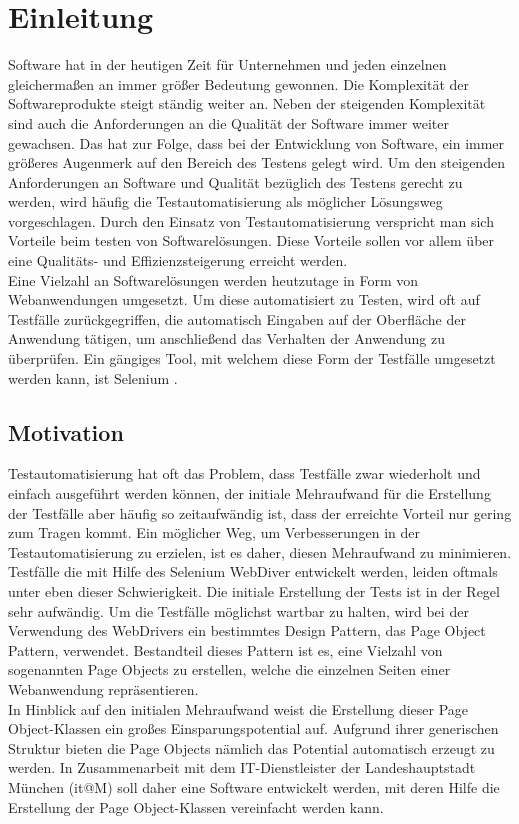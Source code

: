 \chapter{Einleitung}
\label{sec:einleitung}
Software hat in der heutigen Zeit für Unternehmen und jeden einzelnen gleichermaßen an immer größer Bedeutung gewonnen.
Die Komplexität der Softwareprodukte steigt ständig weiter an. Neben der steigenden Komplexität sind auch die Anforderungen an die Qualität der Software immer weiter gewachsen.
Das hat zur Folge, dass bei der Entwicklung von Software, ein immer größeres Augenmerk auf den Bereich des Testens gelegt wird.
Um den steigenden Anforderungen an Software und Qualität bezüglich des Testens gerecht zu werden, wird häufig die Testautomatisierung als möglicher Lösungsweg vorgeschlagen.
Durch den Einsatz von Testautomatisierung verspricht man sich Vorteile beim testen von Softwarelösungen. Diese Vorteile sollen vor allem über eine Qualitäts- und Effizienzsteigerung erreicht werden.\\
Eine Vielzahl an Softwarelösungen werden heutzutage in Form von Webanwendungen umgesetzt.
Um diese automatisiert zu Testen, wird oft auf Testfälle zurückgegriffen, die automatisch Eingaben auf der Oberfläche der Anwendung tätigen, um anschließend das Verhalten der Anwendung zu überprüfen.
Ein gängiges Tool, mit welchem diese Form der Testfälle umgesetzt werden kann, ist Selenium \cite{selenium_selenium_2015}.
\\

\section{Motivation}
\label{sec:motivation}
Testautomatisierung hat oft das Problem, dass Testfälle zwar wiederholt und einfach ausgeführt werden können, der initiale Mehraufwand für die Erstellung der Testfälle aber häufig so zeitaufwändig ist, dass der erreichte Vorteil nur gering zum Tragen kommt. Ein möglicher Weg, um Verbesserungen in der Testautomatisierung zu erzielen, ist es daher, diesen Mehraufwand zu minimieren.\\
Testfälle die mit Hilfe des Selenium WebDiver entwickelt werden, leiden oftmals unter eben dieser Schwierigkeit. Die initiale Erstellung der Tests ist in der Regel sehr aufwändig.
Um die Testfälle möglichst wartbar zu halten, wird bei der Verwendung des WebDrivers ein bestimmtes Design Pattern, das Page Object Pattern, verwendet.
Bestandteil dieses Pattern ist es, eine Vielzahl von sogenannten Page Objects zu erstellen, welche die einzelnen Seiten einer Webanwendung repräsentieren.\\
In Hinblick auf den initialen Mehraufwand weist die Erstellung dieser Page Object-Klassen ein großes Einsparungspotential auf. Aufgrund ihrer generischen Struktur bieten die Page Objects nämlich das Potential automatisch erzeugt zu werden.
In Zusammenarbeit mit dem IT-Dienstleister der Landeshauptstadt München (it@M) soll daher eine Software entwickelt werden, mit deren Hilfe die Erstellung der Page Object-Klassen vereinfacht werden kann.

